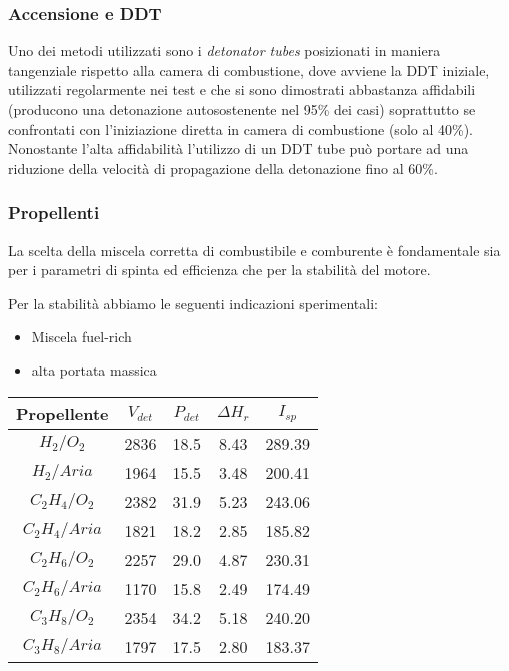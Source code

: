 \begin{frame}
  \frametitle{Accensione e DDT}
  Uno dei metodi utilizzati sono i \textit{detonator tubes} posizionati in maniera tangenziale rispetto alla camera di combustione, dove avviene la DDT iniziale, utilizzati regolarmente nei test e che si sono dimostrati abbastanza affidabili (producono una detonazione autosostenente nel 95\% dei casi) soprattutto se confrontati con l'iniziazione diretta in camera di combustione (solo al 40\%).
  Nonostante l'alta affidabilità l'utilizzo di un DDT tube può portare ad una riduzione della velocità di propagazione della detonazione fino al 60\%.
\end{frame}
\begin{frame}
  \frametitle{Propellenti}
  La scelta della miscela corretta di combustibile e comburente è fondamentale sia per i parametri di spinta ed efficienza che per la stabilità del motore. 

Per la stabilità abbiamo le seguenti indicazioni sperimentali:
  \begin{itemize}
    \item Miscela fuel-rich
    \item alta portata massica
  \end{itemize}
\end{frame}
\begin{frame}
  \centering
  \begin{tabular}{| c | c | c | c | c |}
    \hline
    \textbf{Propellente} & $ V_{det} $  & $ P_{det} $ & $ {\Delta}H_r $  & $ I _{sp} $   \\ \hline 
    $ H_2 /O_2 $ & 2836 & 18.5 & 8.43 & 289.39 \\ \hline 
    $H_2 / Aria $ & 1964 & 15.5 & 3.48 & 200.41 \\ \hline 
    $C_2H_4 / O_2 $ & 2382 & 31.9 & 5.23 & 243.06 \\ \hline 
    $C_2H_4 / Aria $ & 1821 & 18.2 & 2.85 & 185.82 \\ \hline 
    $C_2H_6 / O_2 $ & 2257 & 29.0 & 4.87 & 230.31 \\ \hline 
    $C_2H_6 / Aria $ & 1170 & 15.8 & 2.49 & 174.49 \\ \hline 
    $C_3H_8 / O_2 $ & 2354 & 34.2 & 5.18 & 240.20 \\ \hline 
    $C_3H_8 / Aria $ & 1797 & 17.5 & 2.80 & 183.37 \\  
    \hline
  \end{tabular}
\end{frame}
